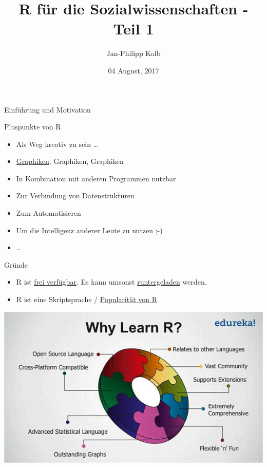 \documentclass[ignorenonframetext,]{beamer}
\title{R für die Sozialwissenschaften - Teil 1}
\author{Jan-Philipp Kolb}
\date{04 August, 2017}
\providecommand{\tightlist}{%
\setlength{\itemsep}{0pt}\setlength{\parskip}{0pt}}
\begin{document}
\frame{\titlepage}

\begin{frame}{Einführung und Motivation}

\end{frame}

\begin{frame}{Pluspunkte von R}

\begin{itemize}
\tightlist
\item
  Als Weg kreativ zu sein \ldots{}
\item
  \href{http://www.sr.bham.ac.uk/~ajrs/R/r-gallery.html}{Graphiken},
  Graphiken, Graphiken
\item
  In Kombination mit anderen Programmen nutzbar
\item
  Zur Verbindung von Datenstrukturen
\item
  Zum Automatisieren
\item
  Um die Intelligenz anderer Leute zu nutzen ;-)
\item
  \ldots{}
\end{itemize}

\end{frame}

\begin{frame}{Gründe}

\begin{itemize}
\tightlist
\item
  R ist \href{https://www.r-project.org/}{frei verfügbar}. Es kann
  umsonst \href{http://www.inside-r.org/why-use-r}{runtergeladen}
  werden.
\item
  R ist eine Skriptsprache /
  \href{http://blog.revolutionanalytics.com/popularity/}{Popularität von
  R}
\end{itemize}

\includegraphics{./tex2pdf.956/364f0e44020784f8f6fab163de30b05c0ebf3d95.png}

\end{frame}
\end{document}
